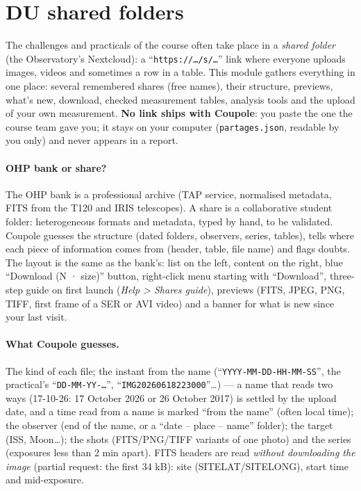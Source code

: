 \section{DU shared folders}\label{sec:partages}
The challenges and practicals of the course often take place in a \emph{shared folder} (the Observatory's Nextcloud):
a “\texttt{https://…/s/…}” link where everyone uploads images, videos and sometimes a row in a table. This module
gathers everything in one place: several remembered shares (free names), their structure, previews, what's new,
download, checked measurement tables, analysis tools and the upload of your own measurement. \textbf{No link ships
with Coupole}: you paste the one the course team gave you; it stays on your computer (\texttt{partages.json},
readable by you only) and never appears in a report.

\paragraph{OHP bank or share?} The OHP bank is a professional archive (TAP service, normalised metadata, FITS from
the T120 and IRIS telescopes). A share is a collaborative student folder: heterogeneous formats and metadata, typed
by hand, to be validated. Coupole guesses the structure (dated folders, observers, series, tables), tells where each
piece of information comes from (header, table, file name) and flags doubts. The layout is the same as the bank's:
list on the left, content on the right, blue “Download (N · size)” button, right-click menu starting with
“Download”, three-step guide on first launch (\emph{Help > Shares guide}), previews (FITS, JPEG, PNG, TIFF, first
frame of a SER or AVI video) and a banner for what is new since your last visit.

\paragraph{What Coupole guesses.} The kind of each file; the instant from the name (“\texttt{YYYY-MM-DD-HH-MM-SS}”,
the practical's “\texttt{DD-MM-YY-…}”, “\texttt{IMG20260618223000}”…) — a name that reads two ways (17-10-26:
17 October 2026 or 26 October 2017) is settled by the upload date, and a time read from a name is marked “from the
name” (often local time); the observer (end of the name, or a “date – place – name” folder); the target (ISS,
Moon…); the shots (FITS/PNG/TIFF variants of one photo) and the series (exposures less than 2 min apart). FITS
headers are read \emph{without downloading the image} (partial request: the first 34 kB): site
(SITELAT/SITELONG), start time and mid-exposure.

